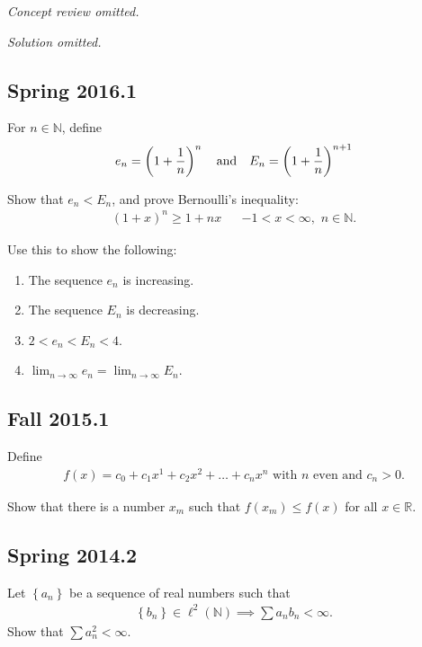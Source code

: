\emph{Concept review omitted.}

\emph{Solution omitted.}

\hypertarget{spring-2016.1}{%
\subsection{Spring 2016.1}\label{spring-2016.1}}

For \(n\in {\mathbb{N}}\), define
\begin{align*}
e_{n} = \left (1+ {1\over n} \right)^{n} 
{\quad \operatorname{and} \quad}
E_{n} = \left( 1+ {1\over n} \right)^{n+1}
\end{align*}

Show that \(e_n < E_n\), and prove Bernoulli's inequality:
\begin{align*}
(1+x)^n \geq 1+nx && -1 < x < \infty  ,\,\, n\in {\mathbb{N}}
.\end{align*}

Use this to show the following:

\begin{enumerate}
\def\labelenumi{\arabic{enumi}.}
\tightlist
\item
  The sequence \(e_n\) is increasing.
\item
  The sequence \(E_n\) is decreasing.
\item
  \(2 < e_n < E_n < 4\).
\item
  \(\lim _{n \to \infty} e_{n} = \lim _{n \to \infty} E_{n}\).
\end{enumerate}

\hypertarget{fall-2015.1}{%
\subsection{Fall 2015.1}\label{fall-2015.1}}

Define
\begin{align*}
f(x)=c_{0}+c_{1} x^{1}+c_{2} x^{2}+\ldots+c_{n} x^{n} \text { with } n \text { even and } c_{n}>0.
\end{align*}

Show that there is a number \(x_m\) such that \(f(x_m) \leq f(x)\) for
all \(x\in {\mathbb{R}}\).

\hypertarget{spring-2014.2}{%
\subsection{Spring 2014.2}\label{spring-2014.2}}

Let \(\left\{{a_n}\right\}\) be a sequence of real numbers such that
\begin{align*}
\left\{{b_n}\right\} \in \ell^2({\mathbb{N}}) \implies \sum a_n b_n < \infty.
\end{align*}
Show that \(\sum a_n^2 < \infty\).

